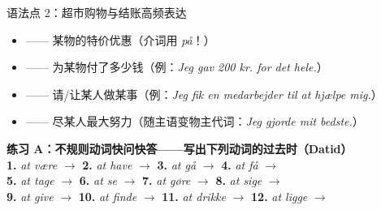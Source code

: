 \begin{grammatikbox}{语法点 2：超市购物与结账高频表达}
\begin{itemize}
  \item {} —— 某物的特价优惠（介词用 \textit{på}！）
  \item {} —— 为某物付了多少钱（例：\textit{Jeg gav 200 kr. for det hele.}）
  \item {} —— 请/让某人做某事（例：\textit{Jeg fik en medarbejder til at hjælpe mig.}）
  \item {} —— 尽某人最大努力（随主语变物主代词：\textit{Jeg gjorde mit bedste.}）
\end{itemize}
\end{grammatikbox}


\textbf{练习 A：不规则动词快问快答——写出下列动词的过去时（Datid）}\\
\textbf{1.} \textit{at være} $\rightarrow$ \underline{\hspace{1.8cm}} \quad \textbf{2.} \textit{at have} $\rightarrow$ \underline{\hspace{1.8cm}} \quad \textbf{3.} \textit{at gå} $\rightarrow$ \underline{\hspace{1.8cm}} \quad \textbf{4.} \textit{at få} $\rightarrow$ \underline{\hspace{1.8cm}}\\
\textbf{5.} \textit{at tage} $\rightarrow$ \underline{\hspace{1.8cm}} \quad \textbf{6.} \textit{at se} $\rightarrow$ \underline{\hspace{1.8cm}} \quad \textbf{7.} \textit{at gøre} $\rightarrow$ \underline{\hspace{1.8cm}} \quad \textbf{8.} \textit{at sige} $\rightarrow$ \underline{\hspace{1.8cm}}\\
\textbf{9.} \textit{at give} $\rightarrow$ \underline{\hspace{1.8cm}} \quad \textbf{10.} \textit{at finde} $\rightarrow$ \underline{\hspace{1.8cm}} \quad \textbf{11.} \textit{at drikke} $\rightarrow$ \underline{\hspace{1.8cm}} \quad \textbf{12.} \textit{at ligge} $\rightarrow$ \underline{\hspace{1.8cm}}

